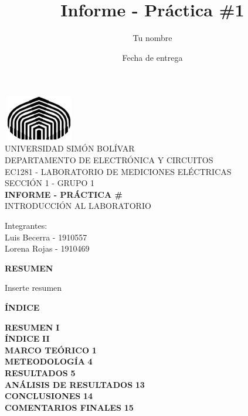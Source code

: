 \documentclass[12pt]{article}
\title{Informe - Práctica \#1}
\author{Tu nombre}
\date{Fecha de entrega}
\begin{document}
	
	\thispagestyle{empty}
	
	\begin{center}
		\includegraphics[width=3.1cm,height=2cm]{logo}\\
		UNIVERSIDAD SIMÓN BOLÍVAR\\
		DEPARTAMENTO DE ELECTRÓNICA Y CIRCUITOS\\
		EC1281 - LABORATORIO DE MEDICIONES ELÉCTRICAS\\
		SECCIÓN 1 - GRUPO 1\\
		
		\vspace{7cm}
		\textbf{\Large INFORME - PRÁCTICA \#}\\
		INTRODUCCIÓN AL LABORATORIO\\
	\end{center}
	
	\begin{flushleft}
		\vspace{9cm}
		\hfill Integrantes:\\
		\hfill {\large Luis Becerra - 1910557}\\
		\hfill {\large Lorena Rojas - 1910469}\\
	\end{flushleft}
	
	\newpage
	
	
	\begin{center}
		\textbf{\large RESUMEN}\\
	\end{center}
	
	Inserte resumen
	
	\newpage
	
	\begin{center}
		\textbf{\large ÍNDICE}\\
	\end{center}
	
	\noindent \textbf{RESUMEN} \hfill \textbf{I}\\
	\noindent \textbf{ÍNDICE} \hfill \textbf{II}\\
	\noindent \textbf{MARCO TEÓRICO} \hfill \textbf{1}\\
	\noindent \textbf{METEODOLOGÍA} \hfill \textbf{4}\\
	\noindent \textbf{RESULTADOS} \hfill \textbf{5}\\
	\noindent \textbf{ANÁLISIS DE RESULTADOS} \hfill \textbf{13}\\
	\noindent \textbf{CONCLUSIONES} \hfill \textbf{14}\\
	\noindent \textbf{COMENTARIOS FINALES} \hfill \textbf{15}\\
	
\end{document}
